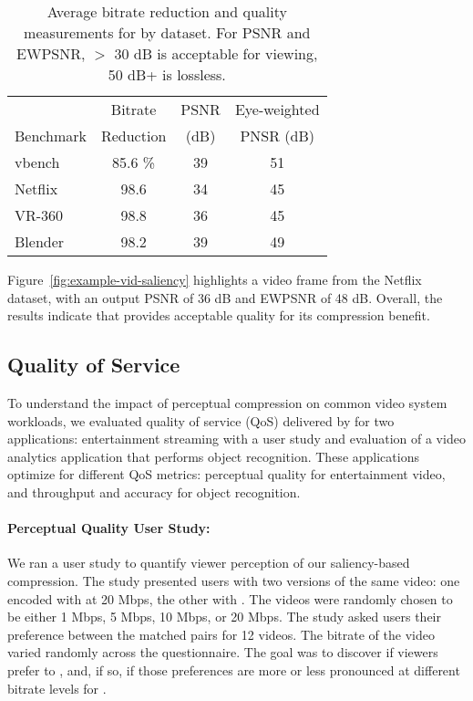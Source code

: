 \begin{table}[h]
  \caption{Average bitrate reduction and quality measurements for \nameCompress by dataset. For PSNR and EWPSNR, $>$ 30 dB is acceptable for viewing, 50 dB+ is lossless.}
  \label{table:dataset-quality}
  \centering
    \begin{tabular}{lccc}
      \toprule
       & Bitrate  & PSNR & Eye-weighted \\
      Benchmark & Reduction &   (dB) & PNSR (dB)  \\ \midrule
      vbench       &   85.6 \%     & 39       &   51                                    \\
      Netflix      & 98.6\phantom{ \%}       & 34        &  45                                 \\
      VR-360      & 98.8\phantom{ \%}        & 36        &  45                                \\
      Blender     & 98.2\phantom{ \%}        & 39        &  49               \\ \bottomrule
    \end{tabular}
\end{table}




Figure~\ref{fig:example-vid-saliency} highlights a \name video frame from the Netflix dataset, with an output PSNR of 36 dB and EWPSNR of 48 dB.
Overall, the results indicate that \nameCompress provides acceptable quality for its compression benefit.


\subsection{Quality of Service}
\label{subsec:qos}
To understand the impact of perceptual compression on common video system workloads, we evaluated quality of service (QoS) delivered by \name for two applications: entertainment streaming with a user study and evaluation of a video analytics application that performs object recognition.
These applications optimize for different QoS metrics: perceptual quality for entertainment video, and throughput and accuracy for object recognition.

\exampleVidSaliencyFigure

\paragraph{Perceptual Quality User Study:} We ran a user study to quantify viewer perception of our saliency-based compression.
The study presented users with two versions of the same video: one encoded with \hevc at 20 Mbps, the other with \nameCompress.
The \nameCompress videos were randomly chosen to be either 1 Mbps, 5 Mbps, 10 Mbps, or 20 Mbps.
The study asked users their preference between the matched pairs for 12 videos.
The bitrate of the \nameCompress video varied randomly across the questionnaire.
The goal was to discover if viewers prefer \nameCompress to \hevc, and, if so, if those preferences are more or less pronounced at different bitrate levels for \name.

